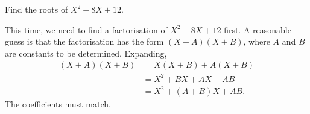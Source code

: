 \begin{example}
Find the roots of $X^2 - 8X + 12$.
\end{example}
\begin{solution}
This time, we need to find a factorisation of $X^2 - 8X + 12$ first. A reasonable guess is that the factorisation has the form $(X + A)(X + B)$, where $A$ and $B$ are constants to be determined. Expanding,
\begin{align*}
(X + A)(X + B) &= X(X + B) + A(X + B) \\
&= X^2 + BX + AX + AB \\
&= X^2 + (A + B)X + AB.
\end{align*}
The coefficients must match, 
\end{solution}